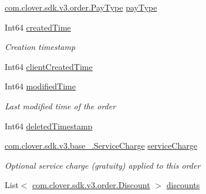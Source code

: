 \begin{DoxyCompactItemize}
\item 
\hyperlink{namespacecom_1_1clover_1_1sdk_1_1v3_1_1order_a0087c2efbeb2cfefd1bc3b78a3f7dbd8}{com.\+clover.\+sdk.\+v3.\+order.\+Pay\+Type} \hyperlink{classcom_1_1clover_1_1sdk_1_1v3_1_1order_1_1_order_a79bae0bc2259c5b9629a477f1d3aebc1}{pay\+Type}
\item 
Int64 \hyperlink{classcom_1_1clover_1_1sdk_1_1v3_1_1order_1_1_order_a17baf1a4ea4ec73b18ef133460a27dd7}{created\+Time}
\begin{DoxyCompactList}\small\item\em Creation timestamp \end{DoxyCompactList}\item 
Int64 \hyperlink{classcom_1_1clover_1_1sdk_1_1v3_1_1order_1_1_order_a8cce0929d31cd32654990b9bac4b7f2a}{client\+Created\+Time}
\item 
Int64 \hyperlink{classcom_1_1clover_1_1sdk_1_1v3_1_1order_1_1_order_a3941e235e72acf803349e87e8d7e3da0}{modified\+Time}
\begin{DoxyCompactList}\small\item\em Last modified time of the order \end{DoxyCompactList}\item 
Int64 \hyperlink{classcom_1_1clover_1_1sdk_1_1v3_1_1order_1_1_order_a56da029ff28fd728403ceda1b706d95f}{deleted\+Timestamp}
\item 
\hyperlink{classcom_1_1clover_1_1sdk_1_1v3_1_1base___1_1_service_charge}{com.\+clover.\+sdk.\+v3.\+base\+\_\+.\+Service\+Charge} \hyperlink{classcom_1_1clover_1_1sdk_1_1v3_1_1order_1_1_order_ae659444ff65f03ada46a9b85dad4025b}{service\+Charge}
\begin{DoxyCompactList}\small\item\em Optional service charge (gratuity) applied to this order \end{DoxyCompactList}\item 
List$<$ \hyperlink{classcom_1_1clover_1_1sdk_1_1v3_1_1order_1_1_discount}{com.\+clover.\+sdk.\+v3.\+order.\+Discount} $>$ \hyperlink{classcom_1_1clover_1_1sdk_1_1v3_1_1order_1_1_order_af2da5f0ec5284218ad9f4ed2952cf227}{discounts}

\end{DoxyCompactItemize}
